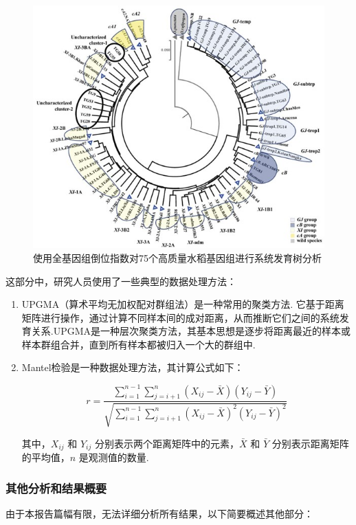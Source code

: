 \begin{figure}[htp!]
	\centering
	\includegraphics[width=0.8\linewidth]{figure/tree}
	\caption{使用全基因组倒位指数对75个高质量水稻基因组进行系统发育树分析} \label{tree}
\end{figure}

这部分中，研究人员使用了一些典型的数据处理方法：

\begin{enumerate}

\item UPGMA（算术平均无加权配对群组法）是一种常用的聚类方法.
它基于距离矩阵进行操作，通过计算不同样本间的成对距离，从而推断它们之间的系统发育关系.UPGMA是一种层次聚类方法，其基本思想是逐步将距离最近的样本或样本群组合并，直到所有样本都被归入一个大的群组中.


\item Mantel检验是一种数据处理方法，其计算公式如下：

$$
r=\frac{\sum_{i=1}^{n-1} \sum_{j=i+1}^n\left(X_{i j}-\bar{X}\right)\left(Y_{i j}-\bar{Y}\right)}{\sqrt{\sum_{i=1}^{n-1} \sum_{j=i+1}^n\left(X_{i j}-\bar{X}\right)^2\left(Y_{i j}-\bar{Y}\right)^2}}
$$

其中，$X_{ij}$ 和 $Y_{ij}$ 分别表示两个距离矩阵中的元素，$\bar{X}$ 和 $\bar{Y}$ 分别表示距离矩阵的平均值，$n$ 是观测值的数量.

\end{enumerate}


\subsubsection{其他分析和结果概要}
由于本报告篇幅有限，无法详细分析所有结果，以下简要概述其他部分：

